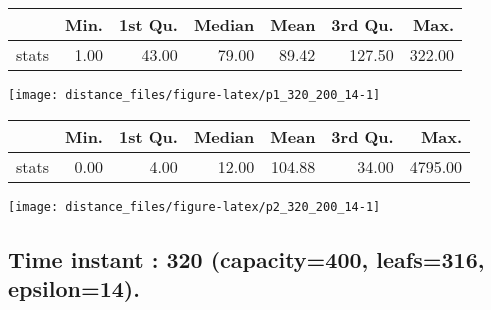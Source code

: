 \documentclass[
  9pt,
  landscape]{article}
\begin{document}
\begin{minipage}{0.5\textwidth} 
\centering 
\begin{tabular}{rrrrrrr}
  \hline
 & Min. & 1st Qu. & Median & Mean & 3rd Qu. & Max. \\ 
  \hline
stats & 1.00 & 43.00 & 79.00 & 89.42 & 127.50 & 322.00 \\ 
   \hline
\end{tabular}
\vspace{0.5cm} 


\texttt{[image: distance\_files/figure-latex/p1\_320\_200\_14-1]} 

\end{minipage} 
\begin{minipage}{0.5\textwidth} 
\centering 
\begin{tabular}{rrrrrrr}
  \hline
 & Min. & 1st Qu. & Median & Mean & 3rd Qu. & Max. \\ 
  \hline
stats & 0.00 & 4.00 & 12.00 & 104.88 & 34.00 & 4795.00 \\ 
   \hline
\end{tabular}
\vspace{0.5cm} 


\texttt{[image: distance\_files/figure-latex/p2\_320\_200\_14-1]} 

\end{minipage}

\pagebreak

\hypertarget{time-instant-320-capacity400-leafs316-epsilon14.}{%
\subsection{Time instant : 320 (capacity=400, leafs=316,
epsilon=14).}\label{time-instant-320-capacity400-leafs316-epsilon14.}}
\end{document}
